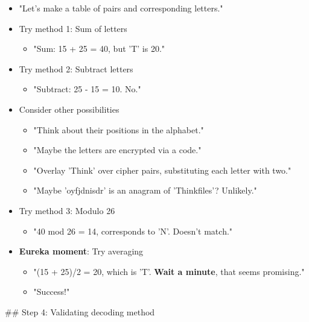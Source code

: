 \documentclass{article}
\begin{document}
\begin{tcolorbox}[colback=wkblue!10!white, colframe=wkblue!100!blue, left=2mm, right=2mm, title=\small\textcolor{black}{A document from \textsc{MathPile}-Ciphers}]
\begin{tiny}
\begin{itemize}
    \item "Let's make a table of pairs and corresponding letters."
    \item Try method 1: Sum of letters
    \begin{itemize}
        \item "Sum: 15 + 25 = 40, but 'T' is 20."
    \end{itemize}
    \item Try method 2: Subtract letters
    \begin{itemize}
        \item "Subtract: 25 - 15 = 10. No."
    \end{itemize}
    \item Consider other possibilities
    \begin{itemize}
        \item "Think about their positions in the alphabet."
        \item "Maybe the letters are encrypted via a code."
        \item "Overlay 'Think' over cipher pairs, substituting each letter with two."
        \item "Maybe 'oyfjdnisdr' is an anagram of 'Thinkfiles'? Unlikely."
    \end{itemize}
    \item Try method 3: Modulo 26
    \begin{itemize}
        \item "40 mod 26 = 14, corresponds to 'N'. Doesn't match."
    \end{itemize}
    \item \textbf{Eureka moment}: Try averaging
    \begin{itemize}
        \item "(15 + 25)/2 = 20, which is 'T'. \textbf{Wait a minute}, that seems promising."
        \item "Success!"
    \end{itemize}
\end{itemize}

\vspace{1.6mm}

\#\# Step 4: Validating decoding method


\end{tiny}
\end{tcolorbox}
\end{document}
